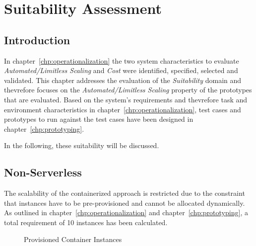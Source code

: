 \chapter{Suitability Assessment}\label{chp:suitabilityAssessment}


\section{Introduction}

In chapter~\vref{chp:operationalization} the two system characteristics to evaluate \textit{Automated/Limitless Scaling} and \textit{Cost} were identified, specified, selected and validated. This chapter addresses the evaluation of the \textit{Suitability} domain and thevrefore focuses on the \textit{Automated/Limitless Scaling} property of the prototypes that are evaluated. Based on the system's requirements and thevrefore task and environment characteristics in chapter~\vref{chp:operationalization}, test cases and prototypes to run against the test cases have been designed in chapter~\vref{chp:prototyping}.

In the following, these suitability will be discussed.

\section{Non-Serverless}\label{chp:suitNSL}

The scalability of the containerized approach is restricted due to the constraint that instances have to be pre-provisioned and cannot be allocated dynamically. As outlined in chapter~\vref{chp:operationalization} and chapter~\vref{chp:prototyping}, a total requirement of 10 instances has been calculated. 

\begin{figure}[ht]
    \centering
    \caption {Provisioned Container Instances}
    \label{graph:provisionedContainerInstances}
\end{figure}

